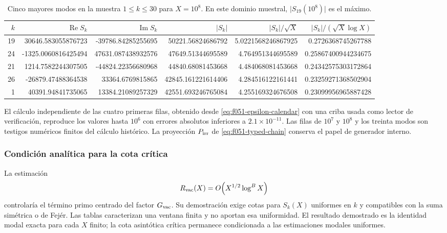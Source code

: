 \begin{table}[htbp]
\centering
\scriptsize
\setlength{\tabcolsep}{3.5pt}
\begin{tabular}{rrrrrr}
\toprule
\(k\) & \(\operatorname{Re}S_k\) & \(\operatorname{Im}S_k\)
 & \(|S_k|\) & \(|S_k|/\sqrt X\) & \(|S_k|/(\sqrt X\log X)\)\\
\midrule
19 & 30646.583055876723 & -39786.84285255695 & 50221.56824686792 & 5.0221568246867925 & 0.2726368745267788\\
24 & -1325.0060816425494 & 47631.087438932576 & 47649.51344695589 & 4.764951344695589 & 0.25867400944234675\\
21 & 1214.7582244307505 & -44824.22356680968 & 44840.68081453668 & 4.484068081453668 & 0.24342575303172864\\
26 & -26879.47488364538 & 33364.6769815865 & 42845.161221614406 & 4.284516122161441 & 0.23259271368502904\\
1 & 40391.94841735065 & 13384.21089257329 & 42551.693246765084 & 4.255169324676508 & 0.23099956965887428\\
\bottomrule
\end{tabular}
\caption{Cinco mayores modos en la muestra \(1\leq k\leq30\) para
\(X=10^8\). En este dominio muestral,
\(\lvert S_{19}(10^8)\rvert\) es el máximo.}
\label{tab:f051-top-five-modes}
\end{table}

El cálculo independiente de las cuatro primeras filas, obtenido desde
\eqref{eq:f051-epsilon-calendar} con una criba usada como lector de
verificaci\'on, reproduce los valores hasta \(10^6\) con errores absolutos
inferiores a \(2.1\times10^{-11}\). Las filas de \(10^7\) y \(10^8\) y los
treinta modos son testigos num\'ericos finitos del c\'alculo hist\'orico. La
proyecci\'on \(P_{\rm irr}\) de \eqref{eq:f051-typed-chain} conserva el papel
de generador interno.

\subsubsection{Condición analítica para la cota crítica}

La estimaci\'on
\begin{equation}
 R_{\rm vac}(X)=O\!\left(X^{1/2}\log^B X\right)
 \label{eq:f051-conditional-bound}
\end{equation}
controlar\'ia el t\'ermino primo centrado del factor \(G_{\rm vac}\). Su
demostraci\'on exige cotas para \(S_k(X)\) uniformes en \(k\) y compatibles
con la suma sim\'etrica o de Fej\'er. Las tablas caracterizan una ventana
finita y no aportan esa uniformidad. El resultado demostrado es la
identidad modal exacta para cada \(X\) finito; la cota asint\'otica cr\'itica
permanece condicionada a las estimaciones modales uniformes.
